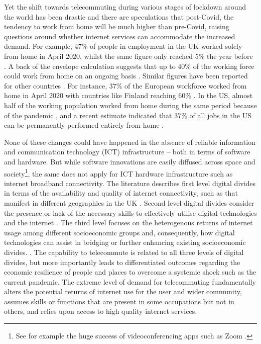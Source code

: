 \documentclass[Royal,times,sageh]{sagej}
\begin{document}
Yet the shift towards telecommuting during various stages of lockdown
around the world has been drastic and there are speculations that
post-Covid, the tendency to work from home will be much higher than
pre-Covid, raising questions around whether internet services can
accommodate the increased demand. For example, \(47\)\% of people in
employment in the UK worked solely from home in April \(2020\), whilst
the same figure only reached \(5\)\% the year before
\citep{ons2020, ons2020lm2019}. A back of the envelope calculation
suggests that up to 40\% of the working force could work from home on an
ongoing basis \citep{batty2020editorial}. Similar figures have been
reported for other countries \citep{felstead2020homeworking}. For
instance, \(37\)\% of the European workforce worked from home in April
\(2020\) with countries like Finland reaching \(60\)\%
\citep{eurofound2020}. In the US, almost half of the working population
worked from home during the same period because of the pandemic
\citep{brynjolfsson2020covid}, and a recent estimate indicated that
\(37\)\% of all jobs in the US can be permanently performed entirely
from home \citep{NBERw26948}.

None of these changes could have happened in the absence of reliable
information and communication technology (ICT) infrastructure -- both in
terms of software and hardware. But while software innovations are
easily diffused across space and society\footnote{See for example the
  huge success of videoconferencing apps such as Zoom
  \citep{marks2020zoom}.}, the same does not apply for ICT hardware
infrastructure such as internet broadband connectivity. The literature
describes first level digital divides in terms of the availability and
quality of internet connectivity, such as that manifest in different
geographies in the UK
\citep{riddlesden2014broadband, philip2017digital}. Second level digital
divides consider the presence or lack of the necessary skills to
effectively utilise digital technologies and the internet
\citep{blank2014dimensions, van2011internet}. The third level focuses on
the heterogenous returns of internet usage among different socioeconomic
groups and, consequently, how digital technologies can assist in
bridging or further enhancing existing socioeconomic divides.
\citep{stern2009levels, van2014digital, van2015third}. The capability to
telecommute is related to all three levels of digital divides, but more
importantly leads to differentiated outcomes regarding the economic
resilience of people and places to overcome a systemic shock such as the
current pandemic. The extreme level of demand for telecommuting
fundamentally alters the potential returns of internet use for the user
and wider community, assumes skills or functions that are present in
some occupations but not in others, and relies upon access to high
quality internet services.
\end{document}
